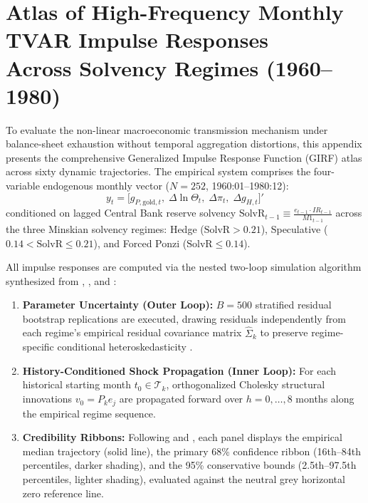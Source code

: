 \section[Monthly TVAR Impulse Response Atlas (1960--1980)]{Atlas of High-Frequency Monthly TVAR Impulse Responses\\Across Solvency Regimes (1960--1980)}
\label{app:annual_tvar}
\label{app:tvar_girf_atlas}

To evaluate the non-linear macroeconomic transmission mechanism under balance-sheet exhaustion without temporal aggregation distortions, this appendix presents the comprehensive Generalized Impulse Response Function (GIRF) atlas across sixty dynamic trajectories. The empirical system comprises the four-variable endogenous monthly vector ($N=252$, 1960:01--1980:12):
\begin{equation}
y_t = \big[ g_{P,\text{gold},t},\; \Delta \ln \Theta_t,\; \Delta \pi_t,\; \Delta g_{H,t} \big]'
\label{eq:app_c_tvar_system}
\end{equation}
conditioned on lagged Central Bank reserve solvency $\text{SolvR}_{t-1} \equiv \frac{e_{t-1} \cdot IR_{t-1}}{M1_{t-1}}$ across the three Minskian solvency regimes: Hedge ($\text{SolvR} > 0.21$), Speculative ($0.14 < \text{SolvR} \le 0.21$), and Forced Ponzi ($\text{SolvR} \le 0.14$).

All impulse responses are computed via the nested two-loop simulation algorithm synthesized from \citet{KoopPesaranPotter1996}, \citet{Balke2000}, and \citet{Afonso2018}:
\begin{enumerate}[leftmargin=2em]
	\item \textbf{Parameter Uncertainty (Outer Loop):} $B = 500$ stratified residual bootstrap replications are executed, drawing residuals independently from each regime's empirical residual covariance matrix $\hat{\Sigma}_k$ to preserve regime-specific conditional heteroskedasticity \citep{GoncalvesKilian2004}.
	\item \textbf{History-Conditioned Shock Propagation (Inner Loop):} For each historical starting month $t_0 \in \mathcal{T}_k$, orthogonalized Cholesky structural innovations $v_0 = P_k e_j$ are propagated forward over $h = 0, \dots, 8$ months along the empirical regime sequence.
	\item \textbf{Credibility Ribbons:} Following \citet{SimsZha1999} and \citet{RodriguezAsensio2026}, each panel displays the empirical median trajectory (solid line), the primary 68\% confidence ribbon (16th--84th percentiles, darker shading), and the 95\% conservative bounds (2.5th--97.5th percentiles, lighter shading), evaluated against the neutral grey horizontal zero reference line.
\end{enumerate}

